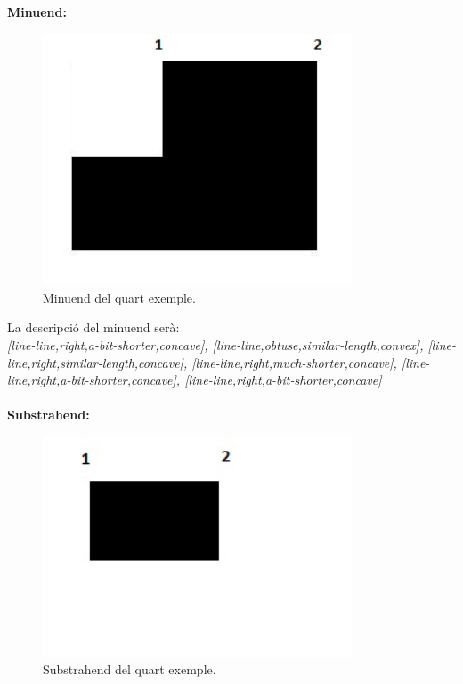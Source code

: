 \documentclass{article}
\begin{document}
{\bf Minuend:}
\begin{figure}[!h]
\centering
\includegraphics[width=260pt]{images/quad_gran_restat.jpg}
\caption {Minuend del quart exemple.}
\label {fig:quad_gran_restat}
\end{figure}

La descripció del minuend serà:
\\
\emph {[line-line,right,a-bit-shorter,concave], [line-line,obtuse,similar-length,convex], [line-line,right,similar-length,concave], [line-line,right,much-shorter,concave], [line-line,right,a-bit-shorter,concave], [line-line,right,a-bit-shorter,concave]}
\\
\\

{\bf Substrahend:}
\begin{figure}[!h]
\centering
\includegraphics[width=260pt]{images/quad_menut.jpg}
\caption {Substrahend del quart exemple.}
\label {fig:quad_punta}
\end{figure}
\end{document}

